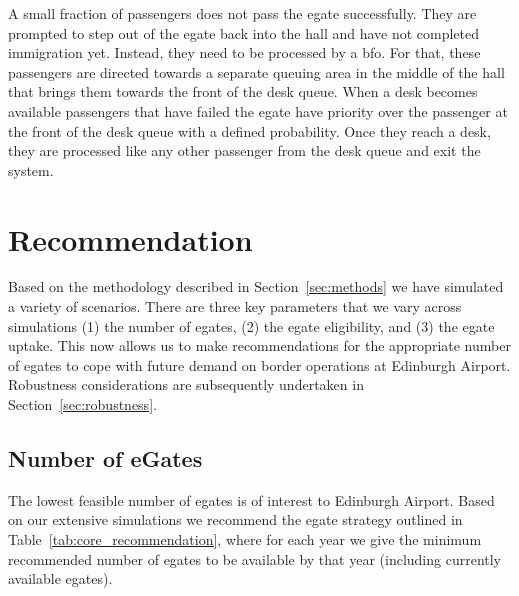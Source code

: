 \documentclass[10pt]{article}
\begin{document}
A small fraction of passengers does not pass the \gls{egate} successfully. They are prompted to step out of the \gls{egate} back into the hall and have not completed immigration yet. Instead, they need to be processed by a \gls{bfo}. For that, these passengers are directed towards a separate queuing area in the middle of the hall that brings them towards the front of the desk queue. When a desk becomes available passengers that have failed the \gls{egate} have priority over the passenger at the front of the desk queue with a defined probability. Once they reach a desk, they are processed like any other passenger from the desk queue and exit the system.



\section{Recommendation}

Based on the methodology described in Section~\ref{sec:methods} we have simulated a variety of scenarios. There are three key parameters that we vary across simulations (1) the number of \glspl{egate}, (2) the \gls{egate} eligibility, and (3) the \gls{egate} uptake. This now allows us to make recommendations for the appropriate number of \glspl{egate} to cope with future demand on border operations at Edinburgh Airport. Robustness considerations are subsequently undertaken in Section~\ref{sec:robustness}. 

\subsection{Number of eGates} \label{sec:rec_num_egates}

The lowest feasible number of \glspl{egate} is of interest to Edinburgh Airport. Based on our extensive simulations we recommend the \gls{egate} strategy outlined in Table~\ref{tab:core_recommendation}, where for each year we give the minimum recommended number of \glspl{egate} to be available by that year (including currently available \glspl{egate}). 



\end{document}
